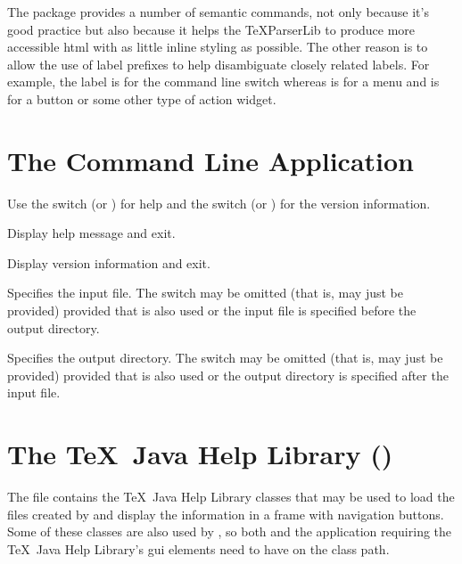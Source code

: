 \documentclass[toc=listof]{scrreport}
\begin{document}
The  package provides a number of semantic commands, not only
because it's good practice but also because it helps the \gls{TeXParserLib} to
produce more accessible \gls{html} with as little inline styling as possible.
The other reason is to allow the use of label prefixes to help disambiguate
closely related labels.  For example, the label  is for the
command line switch  whereas  is for a 
menu and  is for a  button or some other type of
action widget.

\chapter{The  Command Line Application}
\label{sec:texjavahelpmk}


Use the  switch 
(or ) for help and the
 switch
(or ) for the version information.

Display help message and exit.

Display version information and exit.

Specifies the input file. The switch may be omitted (that is,
 may just be provided) provided that
 is also used or the input file is specified before
the output directory.

Specifies the output directory. The switch may be omitted
(that is,  may just be provided) provided that
 is also used or the output directory is specified after
the input file.

\chapter{The \TeX\ Java Help Library ()}
\label{sec:texjavahelplib}

The  file contains the 
\TeX\ Java Help Library classes that may be used to load the
files created by  and display the information in
a frame with navigation buttons. Some of these classes are also used
by , so both  and the
application requiring the \TeX\ Java Help Library's \gls{gui}
elements need to have  on the class path.
\end{document}
